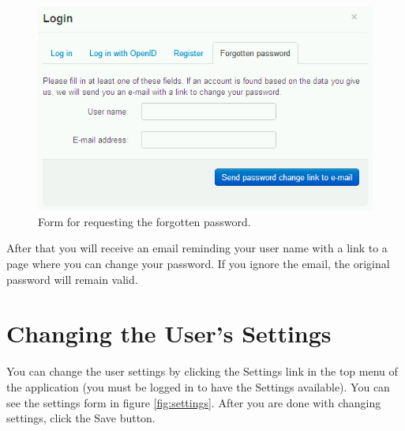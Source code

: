 \begin{figure}[h]
\begin{center}
\includegraphics[scale=0.4]{figures/user_manual/forgotten_password.png}
\end{center}
\caption{Form for requesting the forgotten password.}
\label{fig:forgotten_pass}
\end{figure}

After that you will receive an email reminding your user name with a link to a page where you can change your password. If you ignore the email, the original password will remain valid.

\section{Changing the User's Settings}
\label{sec:settings}

You can change the user settings by clicking the Settings link in the top menu of the application (you must be logged in to have the Settings available). You can see the settings form in figure \ref{fig:settings}. After you are done with changing settings, click the Save button.

